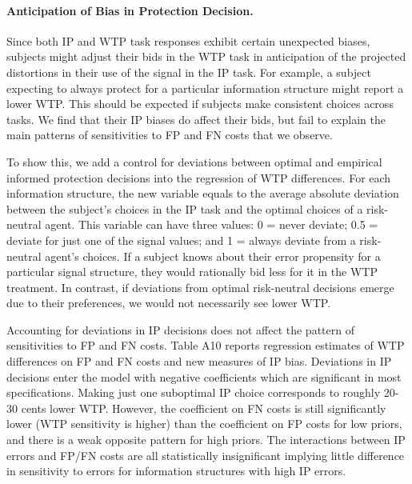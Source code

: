 \documentclass[12pt,a4paper]{article}
\begin{document}
\paragraph{Anticipation of Bias in Protection Decision.} Since both IP and WTP task responses exhibit certain unexpected biases, subjects might adjust their bids in the WTP task in anticipation of the projected distortions in their use of the signal in the IP task. For example, a subject expecting to always protect for a particular information structure might report a lower WTP. This should be expected if subjects make consistent choices across tasks. We find that their IP biases do affect their bids, but fail to explain the main patterns of sensitivities to FP and FN costs that we observe.

To show this, we add a control for deviations between optimal and empirical informed protection decisions into the regression of WTP differences. For each information structure, the new variable equals to the average absolute deviation between the subject's choices in the IP task and the optimal choices of a risk-neutral agent. This variable can have three values: 0 = never deviate; 0.5 = deviate for just one of the signal values; and 1 = always deviate from a risk-neutral agent's choices. If a subject knows about their error propensity for a particular signal structure, they would rationally bid less for it in the WTP treatment. In contrast, if deviations from optimal risk-neutral decisions emerge due to their preferences, we would not necessarily see lower WTP. 

Accounting for deviations in IP decisions does not affect the pattern of sensitivities to FP and FN costs. Table A10 reports regression estimates of WTP differences on FP and FN costs and new measures of IP bias. Deviations in IP decisions enter the model with negative coefficients which are significant in most specifications. Making just one suboptimal IP choice corresponds to roughly 20-30 cents lower WTP. However, the coefficient on FN costs is still significantly lower (WTP sensitivity is higher) than the coefficient on FP costs for low priors, and there is a weak opposite pattern for high priors. The interactions between IP errors and FP/FN costs are all statistically insignificant implying little difference in sensitivity to errors for information structures with high IP errors.
\end{document}
